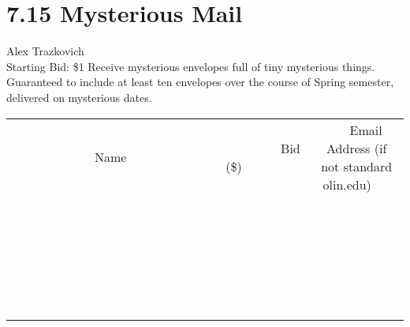 \documentclass[11pt]{article}
\begin{document}
\section*{7.15 Mysterious Mail}
Alex Trazkovich
\\
Starting Bid: \$1
\newline
Receive mysterious envelopes full of tiny mysterious things.   Guaranteed to include at least ten envelopes over the course of Spring semester, delivered on mysterious dates.
\\[6ex]
\begin{tabular}{c c c}
~~~~~~~~~~~~~Name~~~~~~~~~~~~~ & ~~~~~~~~~Bid (\$)~~~~~~~~~  & ~~~Email Address (if not standard olin.edu)~~~\\
 & & \\
\hline
 & & \\
\hline
 & & \\
\hline
 & & \\
\hline
 & & \\
\hline
 & & \\
\hline
 & & \\
\hline
 & & \\
\hline
 & & \\
\hline
 & & \\
\hline
 & & \\
\hline
 & & \\
\hline
 & & \\
\hline
 & & \\
\hline
 & & \\
\hline
 & & \\
\hline
 & & \\
\hline
 & & \\
\hline
 & & \\
\hline
 & & \\
\hline
 & & \\
\hline
 & & \\
\hline
 & & \\
\hline
 & & \\
\hline
 & & \\
\hline
 & & \\
\hline
\end{tabular}
\newpage
\end{document}
